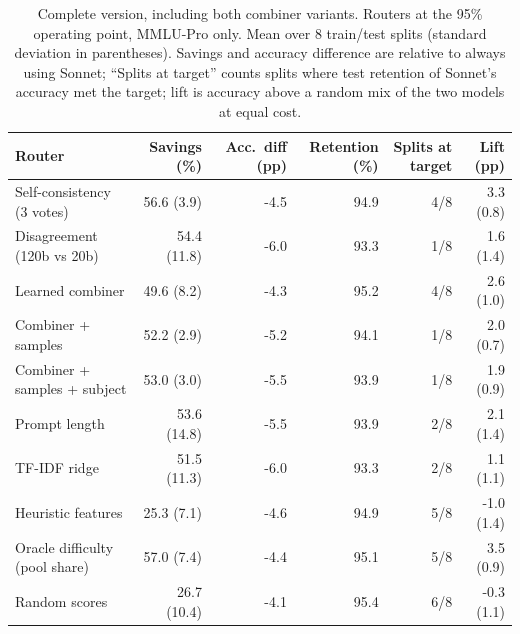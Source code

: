 \begin{table}[!htbp]
\centering\small
\caption{Complete version, including both combiner variants. Routers at the 95\% operating point, MMLU-Pro only. Mean over 8 train/test splits (standard deviation in parentheses). Savings and accuracy difference are relative to always using Sonnet; ``Splits at target'' counts splits where test retention of Sonnet's accuracy met the target; lift is accuracy above a random mix of the two models at equal cost.}\label{tab:95_mmlu_all}
\begin{tabular}{lrrrrr}
\toprule
Router & Savings (\%) & Acc.\ diff (pp) & Retention (\%) & Splits at target & Lift (pp) \\
\midrule
Self-consistency (3 votes) & 56.6 (3.9) & -4.5 & 94.9 & 4/8 & 3.3 (0.8) \\
Disagreement (120b vs 20b) & 54.4 (11.8) & -6.0 & 93.3 & 1/8 & 1.6 (1.4) \\
Learned combiner & 49.6 (8.2) & -4.3 & 95.2 & 4/8 & 2.6 (1.0) \\
Combiner + samples & 52.2 (2.9) & -5.2 & 94.1 & 1/8 & 2.0 (0.7) \\
Combiner + samples + subject & 53.0 (3.0) & -5.5 & 93.9 & 1/8 & 1.9 (0.9) \\
Prompt length & 53.6 (14.8) & -5.5 & 93.9 & 2/8 & 2.1 (1.4) \\
TF-IDF ridge & 51.5 (11.3) & -6.0 & 93.3 & 2/8 & 1.1 (1.1) \\
Heuristic features & 25.3 (7.1) & -4.6 & 94.9 & 5/8 & -1.0 (1.4) \\
Oracle difficulty (pool share) & 57.0 (7.4) & -4.4 & 95.1 & 5/8 & 3.5 (0.9) \\
Random scores & 26.7 (10.4) & -4.1 & 95.4 & 6/8 & -0.3 (1.1) \\
\bottomrule
\end{tabular}
\end{table}
